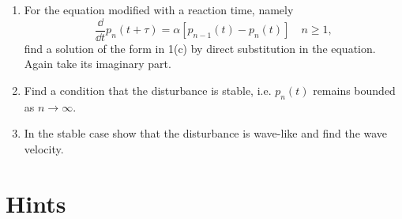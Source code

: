\begin{Exercise}
  \begin{enumerate}
  \item
    For the equation modified with a reaction time, namely
    \[ 
    \frac{\dd}{\dd t} p_n(t+\tau) = \alpha [p_{n-1}(t) - p_n(t) ] \quad n\geq 1,
    \]
    find a solution of the form in 1(c) by direct substitution in the 
    equation.  Again take its imaginary part.
  \item
    Find a condition that the disturbance is stable, i.e. $p_n(t)$ remains
    bounded as $n \to \infty$.
  \item
    In the stable case show that the disturbance is wave-like and find 
    the wave velocity.
  \end{enumerate}
\end{Exercise}






\raggedbottom
\pagebreak
\flushbottom
\section{Hints}




\begin{Hint}
\end{Hint}


\begin{Hint}
\end{Hint}



\begin{Hint}
\end{Hint}



\begin{Hint}
\end{Hint}



